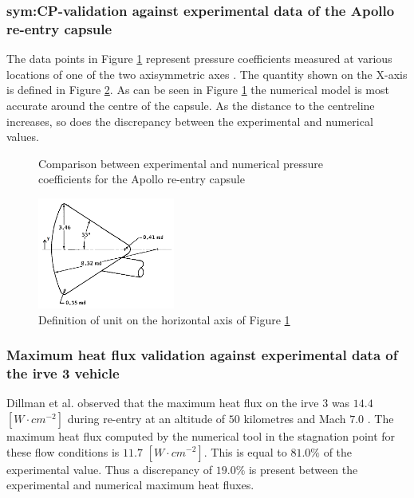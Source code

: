 \subsubsection{\gls{sym:CP}-validation against experimental data of the Apollo re-entry capsule}
\label{subsubsec:Apollo_validation}
The data points in Figure \ref{fig:Apollo_cp} represent pressure coefficients measured at various locations of one of the two axisymmetric axes \cite{Bertin1966}. The quantity shown on the X-axis is defined in Figure \ref{fig:Apollo_y}. As can be seen in Figure \ref{fig:Apollo_cp} the numerical model is most accurate around the centre of the capsule. As the distance to the centreline increases, so does the discrepancy between the experimental and numerical values.

\begin{figure}[ht]
	\centering
	\setlength{} 
	\setlength{}
	
	\caption{Comparison between experimental and numerical pressure coefficients for the Apollo re-entry capsule}
	\label{fig:Apollo_cp}
\end{figure}

\begin{figure}[ht]
	\centering
	\includegraphics[width=0.4\textwidth]{./Figure/Aerodynamics/Apollo_model}
	\caption[Definition of unit on the horizontal axis of Figure \ref{fig:Apollo_cp}]{Definition of unit on the horizontal axis of Figure \ref{fig:Apollo_cp} \cite{Bertin1966}}
	\label{fig:Apollo_y}
\end{figure}

\subsubsection{Maximum heat flux validation against experimental data of the \acrshort{irve} 3 vehicle}
\label{subsubsec:heatvalidation}
Dillman et al. observed that the maximum heat flux on the \acrfull{irve} 3 was $14.4$ $[W\cdot cm^{-2}]$ during re-entry at an altitude of $50$ kilometres and Mach $7.0$ \cite{Dillman2012}. The maximum heat flux computed by the numerical tool in the stagnation point for these flow conditions is $11.7$ $[W\cdot cm^{-2}]$. This is equal to $81.0\%$ of the experimental value. Thus a discrepancy of $19.0\%$ is present between the experimental and numerical maximum heat fluxes.

